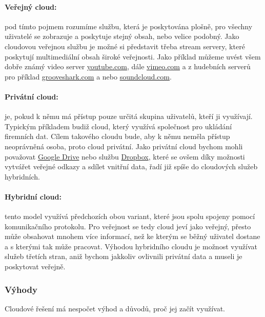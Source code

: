 \paragraph{Veřejný cloud:} pod tímto pojmem rozumíme službu, která je poskytována plošně, pro všechny uživatelé se zobrazuje a poskytuje stejný obsah, nebo velice podobný. Jako cloudovou veřejnou službu je možné si představit třeba stream servery, které poskytují multimediální obsah široké veřejnosti. Jako příklad můžeme uvést všem dobře známý video server  \href{http://youtube.com}{youtube.com}, dále \href{http://vimeo.com}{vimeo.com} a z hudebních serverů pro příklad \href{http://grooveshark.com}{grooveshark.com} a nebo \href{http://soundcloud.com}{soundcloud.com}.

\paragraph{Privátní cloud:} je, pokud k němu má přístup pouze určitá skupina uživatelů, kteří ji využívají. Typickým příkladem budiž cloud, který využívá společnost pro ukládání firemních dat. Cílem takového cloudu bude, aby k němu neměla přístup neoprávněná osoba, proto cloud privátní. Jako privátní cloud bychom mohli považovat \href{https://drive.google.com}{Google Drive} nebo službu \href{https://dropbox.com/}{Dropbox}, které se ovšem díky možnosti vytvářet veřejné odkazy a sdílet vnitřní data, řadí již spíše do cloudových služeb hybridních.

\paragraph{Hybridní cloud:} tento model využívá předchozích obou variant, které jsou spolu spojeny pomocí komunikačního protokolu. Pro veřejnost se tedy cloud jeví jako veřejný, přesto může obsahovat mnohem více informací, než ke kterým se běžný uživatel dostane a s kterými tak může pracovat.
Výhodou hybridního cloudu je možnost využívat služeb třetích stran, aniž bychom jakkoliv ovlivnili privátní data a museli je poskytovat veřejně.

\subsubsection{Výhody}
Cloudové řešení má nespočet výhod a důvodů, proč jej začít využívat.

